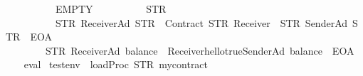 \begin{isabellebody}
\ \ \ \ \ \ \ \ \ \ EMPTY\isanewline
\ \ \ \ \ \ \ \ \ \ {\isacharparenleft}{\kern0pt}STR\ {\isacharprime}{\kern0pt}{\isacharprime}{\kern0pt}{}{\isacharprime}{\kern0pt}{\isacharprime}{\kern0pt}{\isacharparenright}{\kern0pt}\isanewline
\ \ \ \ \ \ \ \ \ \ {\isacharbrackleft}{\kern0pt}{\isacharparenleft}{\kern0pt}STR\ {\isacharprime}{\kern0pt}{\isacharprime}{\kern0pt}ReceiverAd{\isacharprime}{\kern0pt}{\isacharprime}{\kern0pt}{\isacharcomma}{\kern0pt}\ STR\ {\isacharprime}{\kern0pt}{\isacharprime}{\kern0pt}{}{}{}{\isacharprime}{\kern0pt}{\isacharprime}{\kern0pt}{\isacharcomma}{\kern0pt}\ Contract\ {\isacharparenleft}{\kern0pt}STR\ {\isacharprime}{\kern0pt}{\isacharprime}{\kern0pt}Receiver{\isacharprime}{\kern0pt}{\isacharprime}{\kern0pt}{\isacharparenright}{\kern0pt}{\isacharcomma}{\kern0pt}\ {}{\isacharparenright}{\kern0pt}{\isacharcomma}{\kern0pt}\ {\isacharparenleft}{\kern0pt}STR\ {\isacharprime}{\kern0pt}{\isacharprime}{\kern0pt}SenderAd{\isacharprime}{\kern0pt}{\isacharprime}{\kern0pt}{\isacharcomma}{\kern0pt}\ STR\ {\isacharprime}{\kern0pt}{\isacharprime}{\kern0pt}{}{}{}{\isacharprime}{\kern0pt}{\isacharprime}{\kern0pt}{\isacharcomma}{\kern0pt}\ EOA{\isacharcomma}{\kern0pt}\ {}{\isacharparenright}{\kern0pt}{\isacharbrackright}{\kern0pt}\isanewline
\ \ \ \ \ \ \ \ \ \ {\isacharbrackleft}{\kern0pt}{\isacharbrackright}{\kern0pt}\isanewline
\ \ \ \ \ \ \ {\isacharequal}{\kern0pt}\ STR\ {\isacharprime}{\kern0pt}{\isacharprime}{\kern0pt}ReceiverAd{\isacharcolon}{\kern0pt}\ balance{\isacharequal}{\kern0pt}{\isacharequal}{\kern0pt}{}{}{}\ {\isacharminus}{\kern0pt}\ Receiver{\isacharparenleft}{\kern0pt}hello{\isacharequal}{\kern0pt}{\isacharequal}{\kern0pt}true{\isasymnewline}{\isacharparenright}{\kern0pt}{\isasymnewline}SenderAd{\isacharcolon}{\kern0pt}\ balance{\isacharequal}{\kern0pt}{\isacharequal}{\kern0pt}{}{}\ {\isacharminus}{\kern0pt}\ EOA{\isacharprime}{\kern0pt}{\isacharprime}{\kern0pt}{\isachardoublequoteclose}\isanewline
%
\isadelimproof
\ \ %
\endisadelimproof
%
\isatagproof
{}\isamarkupfalse%
\ {\isacharparenleft}{\kern0pt}eval{\isacharparenright}{\kern0pt}%
\endisatagproof
{\isafoldproof}%
%
\isadelimproof
\isanewline
%
\endisadelimproof
\isanewline
{}\isamarkupfalse%
\ {\isachardoublequoteopen}testenv{}\ {\isasymequiv}\ loadProc\ {\isacharparenleft}{\kern0pt}STR\ {\isacharprime}{\kern0pt}{\isacharprime}{\kern0pt}mycontract{\isacharprime}{\kern0pt}{\isacharprime}{\kern0pt}{\isacharparenright}{\kern0pt}\isanewline

\end{isabellebody}
